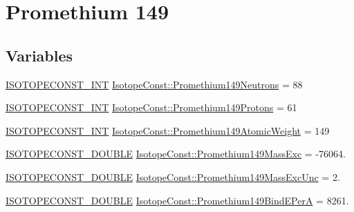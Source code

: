 \hypertarget{group___isotope_const-_promethium-_pm149}{}\section{Promethium 149}
\label{group___isotope_const-_promethium-_pm149}
\subsection*{Variables}
\begin{DoxyCompactItemize}
\item 
\mbox{\hyperlink{group___isotope_const-_macros_ga5f18360b3e99483a35c32d789e62621c}{I\+S\+O\+T\+O\+P\+E\+C\+O\+N\+S\+T\+\_\+\+I\+NT}} \mbox{\hyperlink{group___isotope_const-_promethium-_pm149_gae76f5c32b0006911633c72265dbac170}{Isotope\+Const\+::\+Promethium149\+Neutrons}} = 88
\item 
\mbox{\hyperlink{group___isotope_const-_macros_ga5f18360b3e99483a35c32d789e62621c}{I\+S\+O\+T\+O\+P\+E\+C\+O\+N\+S\+T\+\_\+\+I\+NT}} \mbox{\hyperlink{group___isotope_const-_promethium-_pm149_gaa1c5f990a80023211aec19a2a796bc1d}{Isotope\+Const\+::\+Promethium149\+Protons}} = 61
\item 
\mbox{\hyperlink{group___isotope_const-_macros_ga5f18360b3e99483a35c32d789e62621c}{I\+S\+O\+T\+O\+P\+E\+C\+O\+N\+S\+T\+\_\+\+I\+NT}} \mbox{\hyperlink{group___isotope_const-_promethium-_pm149_gab557e54f8735b26b2eb812f526bcaa77}{Isotope\+Const\+::\+Promethium149\+Atomic\+Weight}} = 149
\item 
\mbox{\hyperlink{group___isotope_const-_macros_ga8f45a7272ce02c0b4c65c44636ed719a}{I\+S\+O\+T\+O\+P\+E\+C\+O\+N\+S\+T\+\_\+\+D\+O\+U\+B\+LE}} \mbox{\hyperlink{group___isotope_const-_promethium-_pm149_ga17d4018d9b41543d7f7dd88088a62a83}{Isotope\+Const\+::\+Promethium149\+Mass\+Exc}} = -\/76064.
\item 
\mbox{\hyperlink{group___isotope_const-_macros_ga8f45a7272ce02c0b4c65c44636ed719a}{I\+S\+O\+T\+O\+P\+E\+C\+O\+N\+S\+T\+\_\+\+D\+O\+U\+B\+LE}} \mbox{\hyperlink{group___isotope_const-_promethium-_pm149_gab6a38fc8d5c5e60429a956f092506337}{Isotope\+Const\+::\+Promethium149\+Mass\+Exc\+Unc}} = 2.
\item 
\mbox{\hyperlink{group___isotope_const-_macros_ga8f45a7272ce02c0b4c65c44636ed719a}{I\+S\+O\+T\+O\+P\+E\+C\+O\+N\+S\+T\+\_\+\+D\+O\+U\+B\+LE}} \mbox{\hyperlink{group___isotope_const-_promethium-_pm149_ga1491193eecc74cee21401e0e8c83ba5a}{Isotope\+Const\+::\+Promethium149\+Bind\+E\+PerA}} = 8261.

\end{DoxyCompactItemize}
